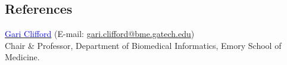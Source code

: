 \documentclass[margin, line]{res}
\newenvironment{list1}{
  \begin{list}{\ding{113}}{%
      \setlength{\itemsep}{0in}
      \setlength{\parsep}{0in} \setlength{\parskip}{0in}
      \setlength{\topsep}{0in} \setlength{\partopsep}{0in} 
      \setlength{\leftmargin}{0.17in}}}{\end{list}}
\begin{document}
\begin{resume}
	
	



\vspace{-3mm}
\section{\sc\textbf{\large{References}}}
\begin{list1}
\item[] \href{http://gdclifford.info/gari}{{\textcolor{blue}{Gari Clifford}}} (E-mail: \href{mailto:gari.clifford@bme.gatech.edu}{gari.clifford@bme.gatech.edu})\\
Chair \& Professor, Department of Biomedical Informatics, Emory School of Medicine.


\end{list1}
\end{resume}
\end{document}
